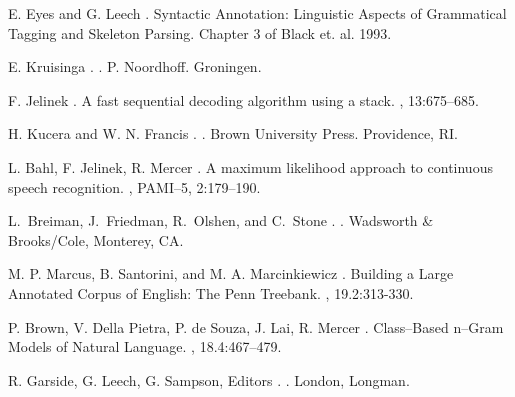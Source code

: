 \begin{thebibliography}{99}
E. Eyes and G. Leech \BBCP.
\newblock Syntactic Annotation: Linguistic Aspects of Grammatical Tagging and Skeleton Parsing.
\newblock Chapter 3 of Black et. al. 1993.

E. Kruisinga \BBCP.
.
\newblock P. Noordhoff.
\newblock Groningen.

F. Jelinek \BBCP.
\newblock A fast sequential decoding algorithm using a stack.
, 13:675--685.

H. Kucera and W. N. Francis \BBCP.
.
\newblock Brown University Press.
\newblock Providence, RI.

L. Bahl, F. Jelinek, R. Mercer \BBCP.
\newblock A maximum likelihood approach to continuous speech recognition.
, PAMI--5, 2:179--190.

L.~Breiman, J.~Friedman, R.~Olshen, and C.~Stone \BBCP.
.
\newblock Wadsworth \& Brooks/Cole, Monterey, CA.

M. P. Marcus, B. Santorini, and M. A. Marcinkiewicz \BBCP.
\newblock Building a Large Annotated Corpus of English: The Penn Treebank.
, 19.2:313-330.

P. Brown, V. Della Pietra, P. de Souza, J. Lai, R. Mercer \BBCP.
\newblock Class--Based n--Gram Models of Natural Language.
, 18.4:467--479.

R. Garside, G. Leech, G. Sampson, Editors \BBCP.
.
\newblock London, Longman.


\end{thebibliography}
